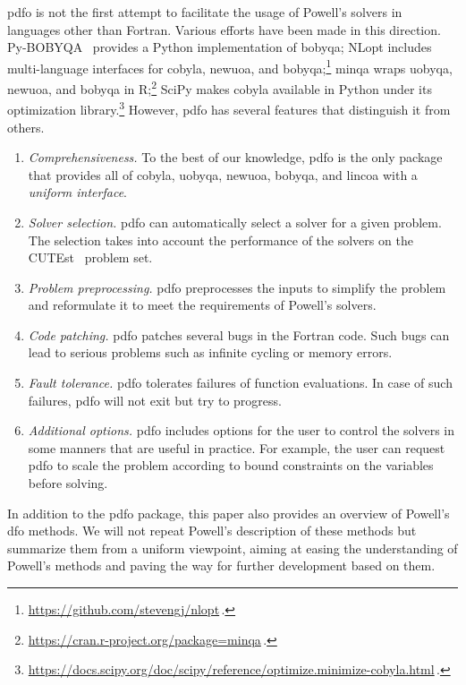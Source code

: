 \documentclass[
    smallextended,  %
    final,          %
]{svjour3}
\begin{document}
\Gls{pdfo} is not the first attempt to facilitate the usage of Powell's solvers in languages other than Fortran.
Various efforts have been made in this direction.
Py-BOBYQA~\cite{Cartis_Etal_2019,Cartis_Roberts_Sheridan-Methven_2022} provides a Python implementation of \gls{bobyqa}; NLopt includes multi-language interfaces for \gls{cobyla}, \gls{newuoa}, and \gls{bobyqa};\footnote{\url{https://github.com/stevengj/nlopt}\,.} minqa wraps \gls{uobyqa}, \gls{newuoa}, and \gls{bobyqa} in R;\footnote{\url{https://cran.r-project.org/package=minqa}\,.} SciPy makes \gls{cobyla} available in Python under its optimization library.\footnote{\url{https://docs.scipy.org/doc/scipy/reference/optimize.minimize-cobyla.html}\,.}
However, \gls{pdfo} has several features that distinguish it from others.
\begin{enumerate}
    \item \emph{Comprehensiveness.}
        To the best of our knowledge, \gls{pdfo} is the only package that provides all of \gls{cobyla}, \gls{uobyqa}, \gls{newuoa}, \gls{bobyqa}, and \gls{lincoa} with a \emph{uniform interface}.
    \item \emph{Solver selection.}
        \Gls{pdfo} can automatically select a solver for a given problem.
        The selection takes into account the performance of the solvers on the CUTEst~\cite{Gould_Orban_Toint_2015} problem set.
    \item \emph{Problem preprocessing.}
        \Gls{pdfo} preprocesses the inputs to simplify the problem and reformulate it to meet the requirements of Powell's solvers.
    \item \emph{Code patching.}
        \Gls{pdfo} patches several bugs in the Fortran code.
        Such bugs can lead to serious problems such as infinite cycling or memory errors.
    \item \emph{Fault tolerance.}
        \Gls{pdfo} tolerates failures of function evaluations.
        In case of such failures, \gls{pdfo} will not exit but try to progress.
    \item \emph{Additional options.}
        \gls{pdfo} includes options for the user to control the solvers in some manners that are useful in practice.
        For example, the user can request \gls{pdfo} to scale the problem according to bound constraints on the variables before solving.
\end{enumerate}

In addition to the \gls{pdfo} package, this paper also provides an overview of Powell's \gls{dfo} methods.
We will not repeat Powell's description of these methods but summarize them from a uniform viewpoint, aiming at easing the understanding of Powell's methods and paving the way for further development based on them.
\end{document}

